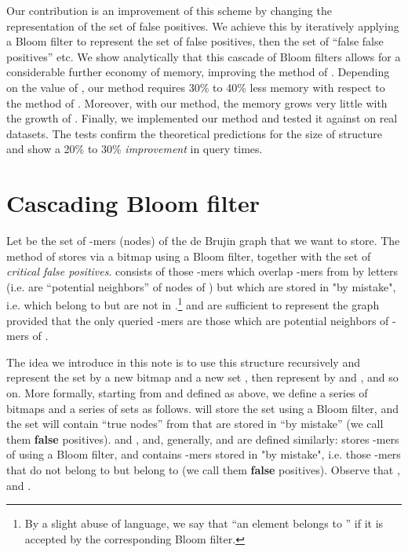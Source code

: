 \documentclass[pdftex]{llncs}\usepackage[T1]{fontenc}
\begin{document}
Our contribution is an improvement of this scheme by changing the
representation of the set of false positives. We achieve this by
iteratively applying a Bloom filter to represent the set of false
positives, then the set of ``false false positives'' etc. We show
analytically that this cascade of Bloom filters allows for a
considerable further economy of memory, improving the method of
\cite{DBLP:conf/wabi/ChikhiR12}. Depending on the value of , our
method requires 30\% to 40\% less memory with respect to the method of
\cite{DBLP:conf/wabi/ChikhiR12}. Moreover, with our method, the memory
grows very little with the growth of . Finally, we implemented our
method and tested it against \cite{DBLP:conf/wabi/ChikhiR12} on real
datasets. The tests confirm the theoretical predictions for the size
of structure and show a 20\% to 30\% \emph{improvement} in query
times.

\section{Cascading Bloom filter}

Let  be the set of -mers (nodes) of the de Brujin graph that we want
to store. The method of \cite{DBLP:conf/wabi/ChikhiR12} stores 
via a bitmap  using a Bloom filter, together with the set 
of {\em critical false positives}.  consists of those -mers
which overlap -mers from  by  letters (i.e. are
``potential neighbors'' of nodes of ) but which are stored in
 "by mistake", i.e. which belong to  but are not in
.\footnote{By a slight abuse of language, we say that ``an
  element belongs to '' if it is accepted by the corresponding
  Bloom filter.}  and  are sufficient to represent the graph
provided that the only queried -mers are those which are potential neighbors of -mers of .

The idea we introduce in this note is to use this structure recursively and represent the set  by a new bitmap  and a new set , then represent  by  and , and so on.
More formally, starting from  and  defined as above, we define a series of bitmaps  and a series of sets 
as follows.
 will store the set  using a Bloom filter, and the set  will contain ``true nodes'' from  that are stored in  ``by mistake'' (we call them {\bf false} positives).  and , and, generally,  and  are defined similarly:  stores -mers of  using a Bloom filter, and  contains -mers stored in  "by mistake", i.e. those -mers that do not belong to  but belong to  (we call them {\bf false} positives). Observe that ,  and .
\end{document}
